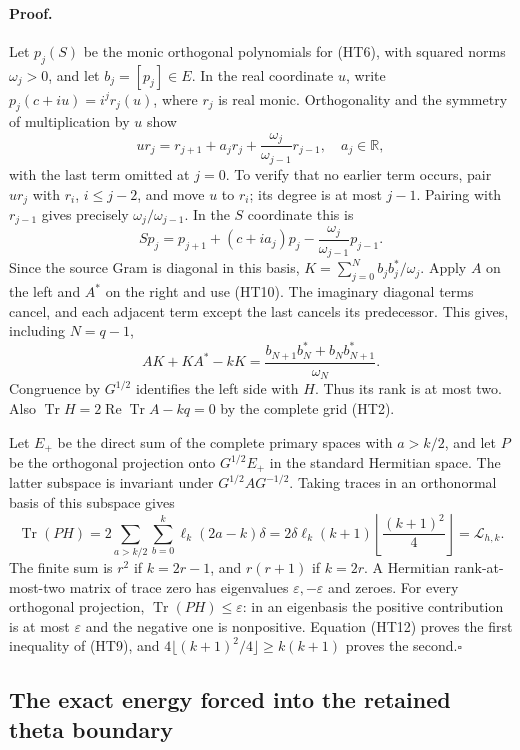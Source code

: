 \paragraph{Proof.}
Let $p_j(S)$ be the monic orthogonal polynomials for (HT6), with squared
norms $\omega_j>0$, and let $b_j=[p_j]\in E$.  In the real coordinate $u$,
write $p_j(c+iu)=i^j r_j(u)$, where $r_j$ is real monic.  Orthogonality
and the symmetry of multiplication by $u$ show
\[
 ur_j=r_{j+1}+a_jr_j+\frac{\omega_j}{\omega_{j-1}}r_{j-1},
 \quad a_j\in\mathbb{R},
\]
with the last term omitted at $j=0$.  To verify that no earlier term
occurs, pair $ur_j$ with $r_i$, $i\leq j-2$, and move $u$ to $r_i$;
its degree is at most $j-1$.  Pairing with $r_{j-1}$ gives precisely
$\omega_j/\omega_{j-1}$.  In the $S$ coordinate this is
\[
 Sp_j=p_{j+1}+(c+ia_j)p_j
 -\frac{\omega_j}{\omega_{j-1}}p_{j-1}.
 \tag{HT10}
\]
Since the source Gram is diagonal in this basis,
$K=\sum_{j=0}^N b_jb_j^*/\omega_j$.  Apply $A$ on the left and $A^*$
on the right and use (HT10).  The imaginary diagonal terms cancel,
and each adjacent term except the last cancels its predecessor.  This
gives, including $N=q-1$,
\[
 AK+KA^*-kK=
 \frac{b_{N+1}b_N^*+b_Nb_{N+1}^*}{\omega_N}.
 \tag{HT11}
\]
Congruence by $G^{1/2}$ identifies the left side with $H$.  Thus its
rank is at most two.  Also
$\operatorname{Tr}H=2\operatorname{Re}\operatorname{Tr}A-kq=0$
by the complete grid (HT2).

Let $E_+$ be the direct sum of the complete primary spaces with $a>k/2$,
and let $P$ be the orthogonal projection onto $G^{1/2}E_+$ in the standard
Hermitian space.  The latter subspace is invariant under
$G^{1/2}AG^{-1/2}$.  Taking traces in an orthonormal basis of this
subspace gives
\[
 \operatorname{Tr}(PH)
 =2\sum_{a>k/2}\sum_{b=0}^{k}\ell_k(2a-k)\delta
 =2\delta\ell_k(k+1)
 \left\lfloor\frac{(k+1)^2}{4}\right\rfloor
 =\mathcal L_{h,k}.
 \tag{HT12}
\]
The finite sum is $r^2$ if $k=2r-1$, and $r(r+1)$ if $k=2r$.
A Hermitian rank-at-most-two matrix of trace zero has eigenvalues
$\varepsilon,-\varepsilon$ and zeroes.  For every orthogonal projection,
$\operatorname{Tr}(PH)\leq\varepsilon$: in an eigenbasis the positive
contribution is at most $\varepsilon$ and the negative one is nonpositive.
Equation (HT12) proves the first inequality of (HT9), and
$4\lfloor(k+1)^2/4\rfloor\geq k(k+1)$ proves the second.\hfill$\square$

\subsection{The exact energy forced into the retained theta boundary}

